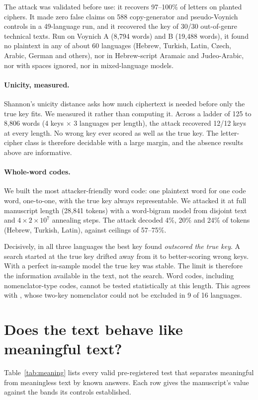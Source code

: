 \documentclass[11pt,a4paper]{article}
\begin{document}
The attack was validated before use: it recovers 97--100\% of letters on planted ciphers. It made zero false claims on 588 copy-generator and pseudo-Voynich controls in a 49-language run, and it recovered the key of 30/30 out-of-genre technical texts. Run on Voynich A (8{,}794 words) and B (19{,}488 words), it found no plaintext in any of about 60 languages (Hebrew, Turkish, Latin, Czech, Arabic, German and others), nor in Hebrew-script Aramaic and Judeo-Arabic, nor with spaces ignored, nor in mixed-language models.

\paragraph{Unicity, measured.} Shannon's unicity distance \citep{shannon1949secrecy} asks how much ciphertext is needed before only the true key fits. We measured it rather than computing it. Across a ladder of 125 to 8{,}806 words (4 keys $\times$ 3 languages per length), the attack recovered 12/12 keys at every length. No wrong key ever scored as well as the true key. The letter-cipher class is therefore decidable with a large margin, and the absence results above are informative.

\paragraph{Whole-word codes.} We built the most attacker-friendly word code: one plaintext word for one code word, one-to-one, with the true key always representable. We attacked it at full manuscript length (28{,}841 tokens) with a word-bigram model from disjoint text and $4\times 2\times10^7$ annealing steps. The attack decoded 4\%, 20\% and 24\% of tokens (Hebrew, Turkish, Latin), against ceilings of 57--75\%.

Decisively, in all three languages the best key found \emph{outscored the true key}. A search started at the true key drifted away from it to better-scoring wrong keys. With a perfect in-sample model the true key was stable. The limit is therefore the information available in the text, not the search. Word codes, including nomenclator-type codes, cannot be tested statistically at this length. This agrees with \citet{zhang2026voynich}, whose two-key nomenclator could not be excluded in 9 of 16 languages.

\section{Does the text behave like meaningful text?}\label{sec:meaning}
Table~\ref{tab:meaning} lists every valid pre-registered test that separates meaningful from meaningless text by known answers. Each row gives the manuscript's value against the bands its controls established.
\end{document}
